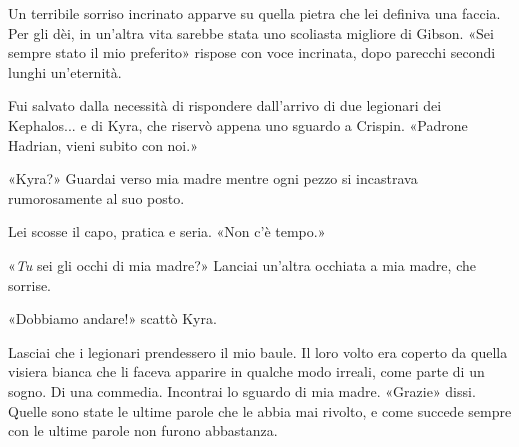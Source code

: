 Un terribile sorriso incrinato apparve su quella pietra che lei definiva
una faccia. Per gli dèi, in un'altra vita sarebbe stata uno scoliasta
migliore di Gibson. «Sei sempre stato il mio preferito» rispose con voce
incrinata, dopo parecchi secondi lunghi un'eternità.

Fui salvato dalla necessità di rispondere dall'arrivo di due legionari
dei Kephalos... e di Kyra, che riservò appena uno sguardo a Crispin.
«Padrone Hadrian, vieni subito con noi.»

«Kyra?» Guardai verso mia madre mentre ogni pezzo si incastrava
rumorosamente al suo posto.

Lei scosse il capo, pratica e seria. «Non c'è tempo.»

«\emph{Tu} sei gli occhi di mia madre?» Lanciai un'altra occhiata a mia
madre, che sorrise.

«Dobbiamo andare!» scattò Kyra.

Lasciai che i legionari prendessero il mio baule. Il loro volto era
coperto da quella visiera bianca che li faceva apparire in qualche modo
irreali, come parte di un sogno. Di una commedia. Incontrai lo sguardo
di mia madre. «Grazie» dissi. Quelle sono state le ultime parole che le
abbia mai rivolto, e come succede sempre con le ultime parole non furono
abbastanza.

